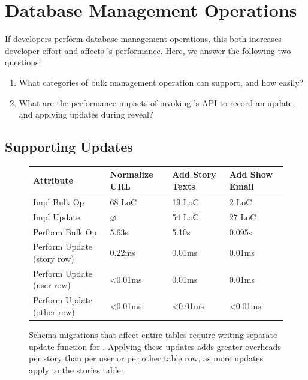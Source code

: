 




\section{Database Management Operations}
\label{s:eval-updates}

%
If developers perform database management operations, this both increases
developer effort and affects \sys's performance. Here, we answer the following two questions:
\begin{enumerate}[nosep]
    \item What categories of bulk management operation can \sys support, and how
        easily? 
    \item What are the performance impacts of invoking \sys's API to record an
        update, and applying updates during reveal?
\end{enumerate}

\subsection{Supporting Updates}
\begin{figure}
    \centering
    \small
    \begin{tabular}{m{}|m{}|m{}|m{}}
        \centering\textbf{Attribute} & \textbf{Normalize URL} & \textbf{Add Story Texts} &
        \textbf{Add Show Email} \\
        \hline
        Impl Bulk Op & 68 LoC & 19 LoC & 2 LoC \\
        \hline
        Impl Update & $\varnothing$ & 54 LoC & 27 LoC \\
        \hline
        Perform Bulk Op & 5.63s & 5.10s & 0.095s\\
        \hline
        Perform Update (story row) & 0.22ms & 0.01ms & 0.01ms \\
        \hline
        Perform Update (user row) & <0.01ms & 0.01ms & 0.01ms \\
        \hline
        Perform Update (other row) & <0.01ms & <0.01ms & <0.01ms \\
    \end{tabular}
    \caption{Schema migrations that affect entire tables require
    writing separate update function for \sys. Applying these updates adds greater overheads per
    story than per user or per other table row, as more updates apply to the
    stories table.}
    \label{tab:updates}
\end{figure}

